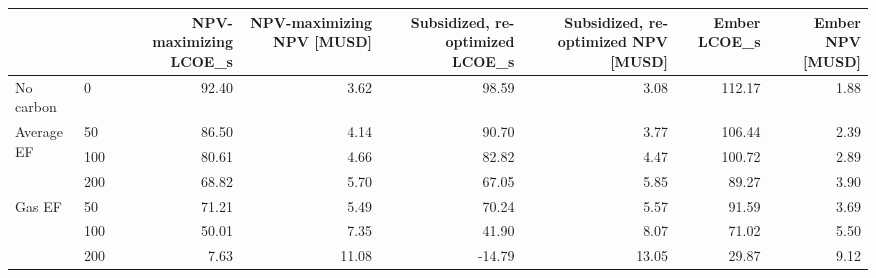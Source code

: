 \begin{tabular}{llrrrrrr}
\toprule
 &  & NPV-maximizing LCOE_s & NPV-maximizing NPV [MUSD] & Subsidized, re-optimized LCOE_s & Subsidized, re-optimized NPV [MUSD] & Ember LCOE_s & Ember NPV [MUSD] \\
\midrule
No carbon & 0 & 92.40 & 3.62 & 98.59 & 3.08 & 112.17 & 1.88 \\
\cline{1-8}
\multirow[t]{3}{*}{Average EF} & 50 & 86.50 & 4.14 & 90.70 & 3.77 & 106.44 & 2.39 \\
 & 100 & 80.61 & 4.66 & 82.82 & 4.47 & 100.72 & 2.89 \\
 & 200 & 68.82 & 5.70 & 67.05 & 5.85 & 89.27 & 3.90 \\
\cline{1-8}
\multirow[t]{3}{*}{Gas EF} & 50 & 71.21 & 5.49 & 70.24 & 5.57 & 91.59 & 3.69 \\
 & 100 & 50.01 & 7.35 & 41.90 & 8.07 & 71.02 & 5.50 \\
 & 200 & 7.63 & 11.08 & -14.79 & 13.05 & 29.87 & 9.12 \\
\cline{1-8}
\bottomrule
\end{tabular}

